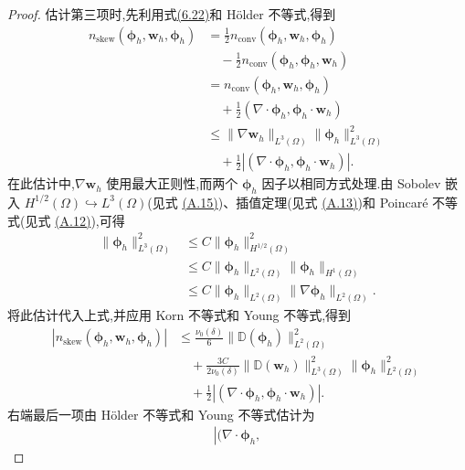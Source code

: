 \begin{lemma}[非线性对流项的估计]
\begin{proof}
估计第三项时,先利用式\hyperref[eq:steady-ns-boundary-product]{(6.22)}和
Hölder 不等式,得到
\begin{equation}\label{eq:smagorinsky-error-convection-third-identity}
\begin{aligned}
n_{\mathrm{skew}}(\symbf{\phi}_h,\bm{w}_h,\symbf{\phi}_h)
&=\frac12 n_{\mathrm{conv}}(\symbf{\phi}_h,\bm{w}_h,\symbf{\phi}_h)\\
&\quad-\frac12 n_{\mathrm{conv}}(\symbf{\phi}_h,\symbf{\phi}_h,\bm{w}_h)\\
&=n_{\mathrm{conv}}(\symbf{\phi}_h,\bm{w}_h,\symbf{\phi}_h)\\
&\quad+\frac12(\nabla\cdot\symbf{\phi}_h,
                 \symbf{\phi}_h\cdot\bm{w}_h)\\
&\le\|\nabla\bm{w}_h\|_{L^3(\Omega)}
       \|\symbf{\phi}_h\|_{L^3(\Omega)}^2\\
&\quad+\frac12\left|(\nabla\cdot\symbf{\phi}_h,
                 \symbf{\phi}_h\cdot\bm{w}_h)\right|.
\end{aligned}
\end{equation}
在此估计中,$\nabla\bm{w}_h$ 使用最大正则性,而两个
$\symbf{\phi}_h$ 因子以相同方式处理.由 Sobolev 嵌入
$H^{1/2}(\Omega)\hookrightarrow L^3(\Omega)$(见式
\hyperref[eq:appendix-a-15]{(A.15)})、插值定理(见式
\hyperref[eq:appendix-a-13]{(A.13)})和 Poincaré 不等式(见式
\hyperref[eq:appendix-a-12]{(A.12)}),可得
\[
\begin{aligned}
\|\symbf{\phi}_h\|_{L^3(\Omega)}^2
&\le C\|\symbf{\phi}_h\|_{H^{1/2}(\Omega)}^2\\
&\le C\|\symbf{\phi}_h\|_{L^2(\Omega)}
       \|\symbf{\phi}_h\|_{H^1(\Omega)}\\
&\le C\|\symbf{\phi}_h\|_{L^2(\Omega)}
       \|\nabla\symbf{\phi}_h\|_{L^2(\Omega)}.
\end{aligned}
\]
将此估计代入上式,并应用 Korn 不等式和 Young 不等式,得到
\[
\begin{aligned}
\left|n_{\mathrm{skew}}(\symbf{\phi}_h,\bm{w}_h,\symbf{\phi}_h)\right|
&\le\frac{\nu_0(\delta)}6
       \|\mathbb{D}(\symbf{\phi}_h)\|_{L^2(\Omega)}^2\\
&\quad+\frac{3C}{2\nu_0(\delta)}
       \|\mathbb{D}(\bm{w}_h)\|_{L^3(\Omega)}^2
       \|\symbf{\phi}_h\|_{L^2(\Omega)}^2\\
&\quad+\frac12\left|(\nabla\cdot\symbf{\phi}_h,
                 \symbf{\phi}_h\cdot\bm{w}_h)\right|.
\end{aligned}
\]
右端最后一项由 Hölder 不等式和 Young 不等式估计为
\[
\begin{aligned}
\left|(\nabla\cdot\symbf{\phi}_h,

\end{aligned}\]
\end{proof}
\end{lemma}
